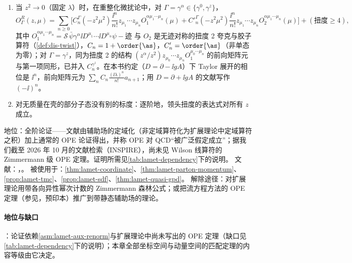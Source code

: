 \begin{assumption}\label{asm:lamet-ope}
\begin{enumerate}[label=(OP\arabic*),leftmargin=3.2em,itemsep=1pt,topsep=2pt]
\item 当 $z^2\to0$（固定 $\lambda$）时，在重整化微扰论中，对 $\Gamma=\gamma^\alpha\in\{\gamma^0,\gamma^z\}$，
\begin{equation}\label{eq:lamet-ope}
O^R_{\Gamma}(z,\mu)=\sum_{n\ge0}\Big[C^\Gamma_n(-z^2\mu^2)\frac{\ii^n}{n!}z_{\mu_1}\cdots z_{\mu_n}O_1^{\alpha\mu_1\cdots\mu_n}(\mu)+C'^\Gamma_n(-z^2\mu^2)\frac{\ii^n}{n!}z_{\mu_1}\cdots z_{\mu_n}O_2^{\alpha\mu_1\cdots\mu_n}(\mu)\Big]+(\text{扭度}\ge4),
\end{equation}
其中 $O_1^{\alpha\mu_1\cdots\mu_n}=\mathcal S\,\bar\psi\gamma^\alpha\ii D^{\mu_1}\cdots\ii D^{\mu_n}\psi-\text{迹}$ 与 $O_2$ 是无迹对称的扭度 2 夸克与胶子算符（\cref{def:dis-twist}），$C_n=1+\order{\as}$，$C'_n=\order{\as}$（非单态为零）；对 $\Gamma=\gamma^z$，同为扭度 2 的结构 $(z^\alpha/z^2)z_{\mu_0}\cdots z_{\mu_n}O_1^{\mu_0\cdots\mu_n}$ 的前向矩阵元与第一项同形，已并入 $C^{\gamma^z}_n$。在本书约定（$D=\partial-\ii gA$）下 Taylor 展开的相位是 $\ii^n$，前向矩阵元为 $\sum_nC_n\frac{(\ii\lambda)^n}{n!}a_{n+1}$；用 $D=\partial+\ii gA$ 的文献写作 $(-\ii)^n$。
\item 对无质量在壳的部分子态没有别的标度：逐阶地，领头扭度的表达式对所有 $z$ 成立。
\end{enumerate}
地位：全阶论证——文献\cite[第~II~节]{IzubuchiEtAl2018}由辅助场的定域化（非定域算符化为扩展理论中定域算符之积）加上通常的 OPE 论证得出，并称 OPE 对 QCD“被广泛假定成立”；据我们截至 2026 年 10 月的文献检索（INSPIRE），尚未见 Wilson 线算符的 Zimmermann 级 OPE 定理。证明所需见\cref{tab:lamet-dependency}下的说明。
文献：\cite[第~II~节]{IzubuchiEtAl2018}，\cite{Radyushkin2017,Braun:2007wv,Ji:2017oey}。
被使用于：\cref{thm:lamet-coordinate}、\cref{thm:lamet-parton-momentum}、\cref{prop:lamet-tmc}、\cref{prop:lamet-sdf}、\cref{thm:lamet-quasi-gpd}。
解除途径：对扩展理论用带各向异性幂次计数的 Zimmermann 森林公式；或把流方程方法的 OPE 定理（参见\cite{Frob:2016mzv}，预印本）推广到带静态辅助场的理论。
\end{assumption}

\paragraph{地位与缺口}
\tagA：论证依赖\cref{asm:lamet-aux-renorm}与扩展理论中尚未写出的 OPE 定理（缺口见\cref{tab:lamet-dependency}下的说明）；本章全部坐标空间与动量空间的匹配定理的内容等级由它决定。

